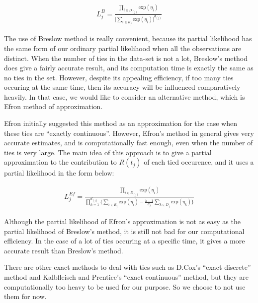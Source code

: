 \documentclass[]{article}
\begin{document}
\begin{equation}\begin{aligned}\label{eqn:tie1forBres}
L_j^B = \frac{\prod_{i \in D_{(j)}} \text{exp}(\eta_i)}{\big[ \sum_{i\in R_{j}} \text{exp}(\eta_i) \big]^{d_{(j)}}}
\end{aligned}\end{equation}

The use of Breslow method is really convenient, because its partial
likelihood has the same form of our ordinary partial likelihood when all
the observations are distinct. When the number of ties in the data-set
is not a lot, Breslow's method does give a fairly accurate result, and
its computation time is exactly the same as no ties in the set. However,
despite its appealing efficiency, if too many ties occuring at the same
time, then its accuracy will be influenced comparatively heavily. In
that case, we would like to consider an alternative method, which is
Efron method of approximation.

Efron initially suggested this method as an approximation for the case
when these ties are ``exactly continuous''. However, Efron's method in
general gives very accurate estimates, and is computationally fast
enough, even when the number of ties is very large. The main idea of
this approach is to give a partial approximation to the contribution to
\(R(t_j)\) of each tied occurence, and it uses a partial likelihood in
the form below:

\begin{equation}\begin{aligned}\label{eqn:tie1forEf}
L_j^{Ef} = \frac{\prod_{i \in D_{(j)}} \text{exp}(\eta_i)}{\prod_{h = 1}^{d_{(j)}} \bigg \{\sum_{i\in R_{j}} \text{exp}(\eta_i) - \frac{h-1}{d_j}\sum_{k\in D_{j}} \text{exp}(\eta_k) \bigg \}}
\end{aligned}\end{equation}

Although the partial likelihood of Efron's approximation is not as easy
as the partial likelihood of Breslow's method, it is still not bad for
our computational efficiency. In the case of a lot of ties occuring at a
specific time, it gives a more accurate result than Breslow's method.

There are other exact methods to deal with ties such as D.Cox's ``exact
discrete'' method and Kalbfleisch and Prentice's ``exact continuous''
method, but they are computationally too heavy to be used for our
purpose. So we choose to not use them for now.
\end{document}
